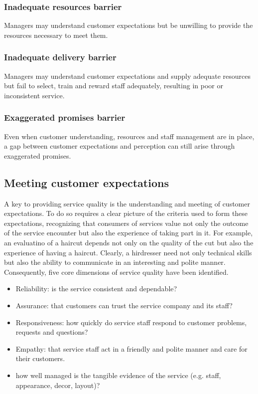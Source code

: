 \documentclass{article}
\begin{document}
\subsubsection*{Inadequate resources barrier}
Managers may understand customer expectations but be unwilling to provide the resources necessary to meet them.

\subsubsection*{Inadequate delivery barrier}Managers may understand customer expectations and supply adequate resources but fail to select, train and reward staff adequately, resulting in poor or inconsistent service.

\subsubsection*{Exaggerated promises barrier}
Even when customer understanding, resources and staff management are in place, a gap between customer expectations and perception can still arise through exaggerated promises.

\subsection{Meeting customer expectations}
A key to providing service quality is the understanding and meeting of customer expectations. To do so requires a clear picture of the criteria used to form these expectations, recognizing that consumers of services value not only the outcome of the service encounter but also the experience of taking part in it. For example, an evaluatino of a haircut depends not only on the quality of the cut but also the experience of having a haircut. Clearly, a hirdresser need not only technical skills but also the ability to communicate in an interesting and polite manner. Consequently, five core dimensions of service quality have been identified.
\begin{itemize}
    \item Reliability: is the service consistent and dependable?
    \item Assurance: that customers can trust the service company and its staff?
    \item Responsiveness: how quickly do service staff respond to customer problems, requests and questions?
    \item Empathy: that service staff act in a friendly and polite manner and care for their customers.
    \item how well managed is the tangible evidence of the service (e.g. staff, appearance, decor, layout)?
\end{itemize}
\end{document}
